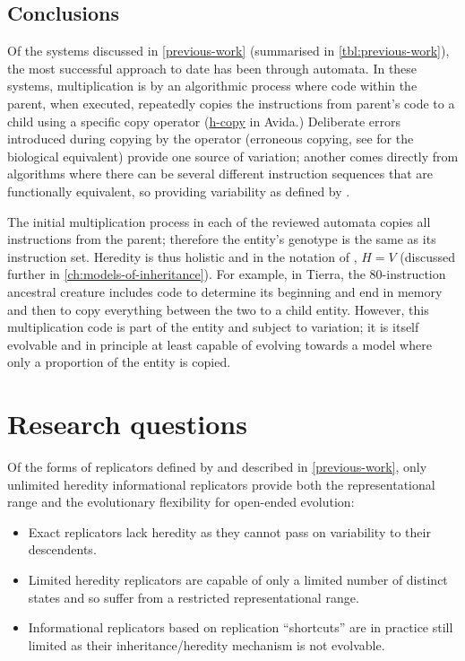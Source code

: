 \subsection{Conclusions}

Of the systems discussed in \cref{previous-work} (summarised in \cref{tbl:previous-work}), the most successful approach to date has been through automata. In these systems, multiplication is by an algorithmic process where code within the parent, when executed, repeatedly copies the instructions from parent's code to a child using a specific copy operator (\eg \url{h-copy} in Avida.) Deliberate errors introduced during copying by the operator (erroneous copying, see \textcite[p.16]{Zachar2010} for the biological equivalent) provide one source of variation; another comes directly from algorithms where there can be several different instruction sequences that are functionally equivalent, so providing variability as defined by \citeauthor{Zachar2010}.

The initial multiplication process in each of the reviewed automata copies all instructions from the parent; therefore the entity's genotype is the same as its instruction set. Heredity is thus holistic and in the notation of \citeauthor{Zachar2010}, $H=V$ (discussed further in \cref{ch:models-of-inheritance}). For example, in Tierra, the 80-instruction ancestral creature includes code to determine its beginning and end in memory and then to copy everything between the two to a child entity. However, this multiplication code is part of the entity and subject to variation; it is itself evolvable and in principle at least capable of evolving towards a model where only a proportion of the entity is copied.

\section{Research questions}\label{research-questions}

Of the forms of replicators defined by \textcite{Zachar2010} and described in \cref{previous-work}, only unlimited heredity informational replicators provide both the representational range and the evolutionary flexibility for open-ended evolution:

\begin{itemize}[noitemsep]
	\item Exact replicators lack heredity as they cannot pass on variability to their descendents.
	\item Limited heredity replicators are capable of only a limited number of distinct states and so suffer from a restricted representational range.
	\item Informational replicators based on replication ``shortcuts'' are in practice still limited as their inheritance/heredity mechanism is not evolvable.
\end{itemize} 

